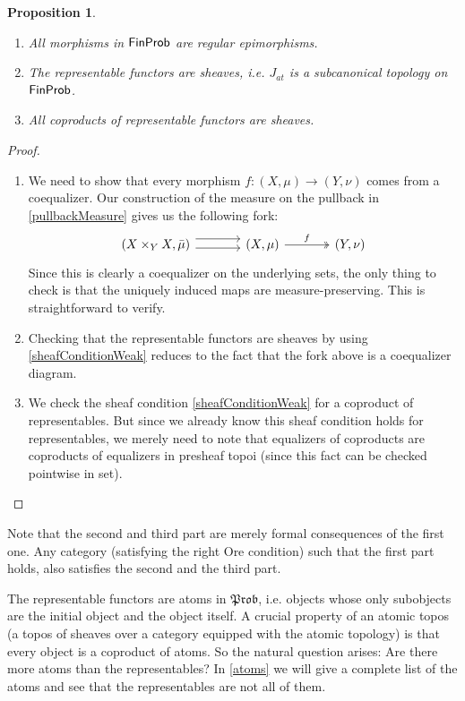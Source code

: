 \documentclass[a4paper]{amsproc}
\theoremstyle{plain}
\newtheorem{proposition}[theorem]{Proposition}
\theoremstyle{definition}
\theoremstyle{remark}
\numberwithin{equation}{section}
\newcommand{\FinProb}{\textup{\textsf{FinProb}}}
\newcommand{\Prob}{\mathfrak{Prob}}
\begin{document}
\begin{proposition}\label{subcanonical}
    \begin{enumerate}
        \item All morphisms in $\FinProb$ are regular epimorphisms.
        \item The representable functors are sheaves, i.e. $J_{at}$ is a subcanonical topology on $\FinProb$.
        \item All coproducts of representable functors are sheaves.
    \end{enumerate}
\end{proposition}
\begin{proof}
    \begin{enumerate}
        \item We need to show that every morphism $f:(X,\mu)\rightarrow (Y, \nu)$ comes from a coequalizer. Our construction of the measure on the pullback in \ref{pullbackMeasure} gives us the following fork:
        \[
        \begin{tikzcd}[column sep=large]
        (X \times_Y X, \bar{\mu}) \arrow[r, shift left=2] \arrow[r, shift right] & (X,\mu) \arrow[r, "f", two heads] & (Y,\nu)
        \end{tikzcd}
        \]
        Since this is clearly a coequalizer on the underlying sets, the only thing to check is that the uniquely induced maps are measure-preserving. This is straightforward to verify.

        \item Checking that the representable functors are sheaves by using \ref{sheafConditionWeak} reduces to the fact that the fork above is a coequalizer diagram.

        \item We check the sheaf condition \ref{sheafConditionWeak} for a coproduct of representables. But since we already know this sheaf condition holds for representables, we merely need to note that equalizers of coproducts are coproducts of equalizers in presheaf topoi (since this fact can be checked pointwise in set).
    \end{enumerate}
\end{proof}

Note that the second and third part are merely formal consequences of the first one. Any category (satisfying the right Ore condition) such that the first part holds, also satisfies the second and the third part.

The representable functors are atoms in $\Prob$, i.e. objects whose only subobjects are the initial object and the object itself. A crucial property of an atomic topos (a topos of sheaves over a category equipped with the atomic topology) is that every object is a coproduct of atoms. So the natural question arises: Are there more atoms than the representables? In \ref{atoms} we will give a complete list of the atoms and see that the representables are not all of them.
\end{document}
